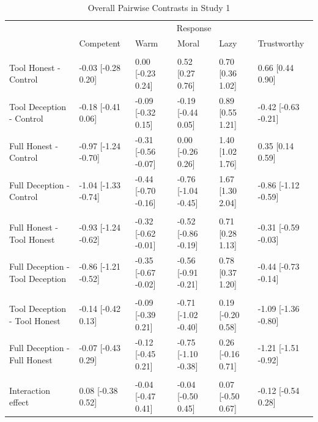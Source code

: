 \documentclass[
  man,
  floatsintext,
  longtable,
  nolmodern,
  notxfonts,
  notimes,
  colorlinks=true,linkcolor=blue,citecolor=blue,urlcolor=blue]{apa7}
\begin{document}
\begin{table}

{\caption{{Overall Pairwise Contrasts in Study 1
\vspace{20pt}}{\label{tbl-treatment-diffs-study1}}}
\vspace{-20pt}}

\begingroup\fontsize{8}{10}\selectfont

\begin{tabular}{llllll}
\toprule
\multicolumn{1}{c}{ } & \multicolumn{5}{c}{Response} \\
\cmidrule(l{3pt}r{3pt}){2-6}
  & Competent & Warm & Moral & Lazy & Trustworthy\\
\midrule
\addlinespace[0.3em]
\multicolumn{6}{l}{\textbf{Comparison to control}}\\
\hspace{1em}Tool Honest - Control & -0.03 [-0.28 0.20] & 0.00 [-0.23 0.24] & 0.52 [0.27 0.76] & 0.70 [0.36 1.02] & 0.66 [0.44 0.90]\\
\hspace{1em}Tool Deception - Control & -0.18 [-0.41 0.06] & -0.09 [-0.32 0.15] & -0.19 [-0.44 0.05] & 0.89 [0.55 1.21] & -0.42 [-0.63 -0.21]\\
\hspace{1em}Full Honest - Control & -0.97 [-1.24 -0.70] & -0.31 [-0.56 -0.07] & 0.00 [-0.26 0.26] & 1.40 [1.02 1.76] & 0.35 [0.14 0.59]\\
\hspace{1em}Full Deception - Control & -1.04 [-1.33 -0.74] & -0.44 [-0.70 -0.16] & -0.76 [-1.04 -0.45] & 1.67 [1.30 2.04] & -0.86 [-1.12 -0.59]\\
\addlinespace[0.3em]
\multicolumn{6}{l}{\textbf{Effect of full outsourcing}}\\
\hspace{1em}Full Honest - Tool Honest & -0.93 [-1.24 -0.62] & -0.32 [-0.62 -0.01] & -0.52 [-0.86 -0.19] & 0.71 [0.28 1.13] & -0.31 [-0.59 -0.03]\\
\hspace{1em}Full Deception - Tool Deception & -0.86 [-1.21 -0.52] & -0.35 [-0.67 -0.02] & -0.56 [-0.91 -0.21] & 0.78 [0.37 1.20] & -0.44 [-0.73 -0.14]\\
\addlinespace[0.3em]
\multicolumn{6}{l}{\textbf{Effect of deception}}\\
\hspace{1em}Tool Deception - Tool Honest & -0.14 [-0.42 0.13] & -0.09 [-0.39 0.21] & -0.71 [-1.02 -0.40] & 0.19 [-0.20 0.58] & -1.09 [-1.36 -0.80]\\
\hspace{1em}Full Deception - Full Honest & -0.07 [-0.43 0.29] & -0.12 [-0.45 0.21] & -0.75 [-1.10 -0.38] & 0.26 [-0.16 0.71] & -1.21 [-1.51 -0.92]\\
\addlinespace[0.3em]
\multicolumn{6}{l}{\textbf{Interaction effect}}\\
\hspace{1em}Interaction effect & 0.08 [-0.38 0.52] & -0.04 [-0.47 0.41] & -0.04 [-0.50 0.45] & 0.07 [-0.50 0.67] & -0.12 [-0.54 0.28]\\
\bottomrule
\end{tabular}
\endgroup{}\vspace{20pt}


\end{table}
\end{document}
